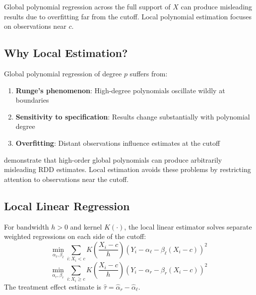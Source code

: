 Global polynomial regression across the full support of $X$ can produce misleading results due to overfitting far from the cutoff. Local polynomial estimation focuses on observations near $c$.

\subsection{Why Local Estimation?}

\begin{proposition}
Global polynomial regression of degree $p$ suffers from:
\begin{enumerate}
    \item \textbf{Runge's phenomenon}: High-degree polynomials oscillate wildly at boundaries
    \item \textbf{Sensitivity to specification}: Results change substantially with polynomial degree
    \item \textbf{Overfitting}: Distant observations influence estimates at the cutoff
\end{enumerate}
\end{proposition}

\citet{gelman2019high} demonstrate that high-order global polynomials can produce arbitrarily misleading RDD estimates. Local estimation avoids these problems by restricting attention to observations near the cutoff.

\subsection{Local Linear Regression}

\begin{definition}
\label{def:local_linear_rdd}
For bandwidth $h > 0$ and kernel $K(\cdot)$, the local linear estimator solves separate weighted regressions on each side of the cutoff:
\begin{equation}
    \min_{\alpha_\ell, \beta_\ell} \sum_{i: X_i < c} K\left(\frac{X_i - c}{h}\right) \left(Y_i - \alpha_\ell - \beta_\ell (X_i - c)\right)^2
\end{equation}
\begin{equation}
    \min_{\alpha_r, \beta_r} \sum_{i: X_i \geq c} K\left(\frac{X_i - c}{h}\right) \left(Y_i - \alpha_r - \beta_r (X_i - c)\right)^2
\end{equation}
The treatment effect estimate is $\hat{\tau} = \hat{\alpha}_r - \hat{\alpha}_\ell$.
\end{definition}

